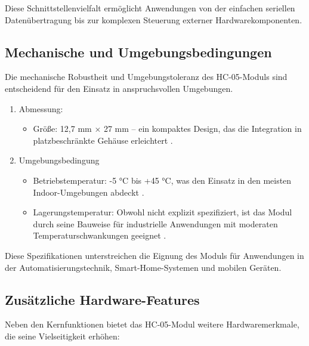 Diese Schnittstellenvielfalt ermöglicht Anwendungen von der einfachen seriellen Datenübertragung bis zur komplexen Steuerung externer Hardwarekomponenten.	
	
\subsection {Mechanische und Umgebungsbedingungen}

Die mechanische Robustheit und Umgebungstoleranz des HC-05-Moduls sind entscheidend für den Einsatz in anspruchsvollen Umgebungen.

\begin{enumerate}
	\item Abmessung:
	\begin{itemize}
		\item Größe: 12,7 mm × 27 mm – ein kompaktes Design, das die Integration in platzbeschränkte Gehäuse erleichtert \cite{HC05Datasheet:2010}.
	\end{itemize}
	\item Umgebungsbedingung 
	\begin{itemize}
		\item Betriebstemperatur: -5 °C bis +45 °C, was den Einsatz in den meisten Indoor-Umgebungen abdeckt \cite{ReicheltHC05:2025}.
		\item Lagerungstemperatur: Obwohl nicht explizit spezifiziert, ist das Modul durch seine Bauweise für industrielle Anwendungen mit moderaten Temperaturschwankungen geeignet \cite{HC05Datasheet:2010}.
	\end{itemize} 
\end{enumerate}

Diese Spezifikationen unterstreichen die Eignung des Moduls für Anwendungen in der Automatisierungstechnik, Smart-Home-Systemen und mobilen Geräten.

\subsection{ Zusätzliche Hardware-Features}

Neben den Kernfunktionen bietet das HC-05-Modul weitere Hardwaremerkmale, die seine Vielseitigkeit erhöhen:

